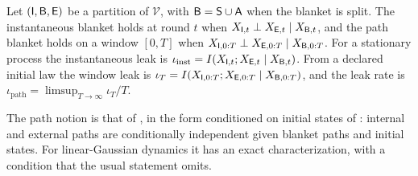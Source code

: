 \begin{definition}\label{def:col-blankets}
Let $(\mathsf{I},\mathsf{B},\mathsf{E})$ be a partition of $\mathcal V$, with $\mathsf{B}=\mathsf{S}\cup\mathsf{A}$ when the blanket is split. The instantaneous blanket holds at round $t$ when $X_{\mathsf{I},t}\perp X_{\mathsf{E},t}\mid X_{\mathsf{B},t}$, and the path blanket holds on a window $[0,T]$ when $X_{\mathsf{I},0:T}\perp X_{\mathsf{E},0:T}\mid X_{\mathsf{B},0:T}$. For a stationary process the instantaneous leak is $\iota_{\mathrm{inst}}=I(X_{\mathsf{I},t};X_{\mathsf{E},t}\mid X_{\mathsf{B},t})$. From a declared initial law the window leak is $\iota_T=I(X_{\mathsf{I},0:T};X_{\mathsf{E},0:T}\mid X_{\mathsf{B},0:T})$, and the leak rate is $\iota_{\mathrm{path}}=\limsup_{T\to\infty}\iota_T/T$.
\end{definition}

The path notion is that of \citet{friston2023path}, in the form conditioned on initial states of \citet{friston2023simpler}: internal and external paths are conditionally independent given blanket paths and initial states. For linear-Gaussian dynamics it has an exact characterization, with a condition that the usual statement omits.

